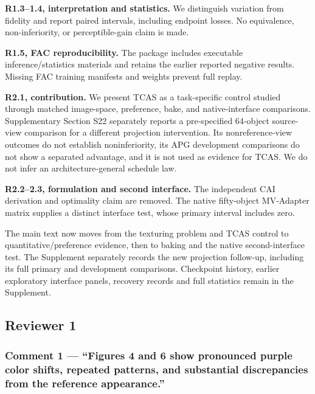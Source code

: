 \documentclass[
]{article}
\begin{document}
\textbf{R1.3--1.4, interpretation and statistics.} We distinguish
variation from fidelity and report paired intervals, including endpoint
losses. No equivalence, non-inferiority, or perceptible-gain claim is
made.

\textbf{R1.5, FAC reproducibility.} The package includes executable
inference/statistics materials and retains the earlier reported negative
results. Missing FAC training manifests and weights prevent full replay.

\textbf{R2.1, contribution.} We present TCAS as a task-specific control
studied through matched image-space, preference, bake, and
native-interface comparisons. Supplementary Section S22 separately
reports a pre-specified 64-object source-view comparison for a different
projection intervention. Its nonreference-view outcomes do not establish
noninferiority, its APG development comparisons do not show a separated
advantage, and it is not used as evidence for TCAS. We do not infer an
architecture-general schedule law.

\textbf{R2.2--2.3, formulation and second interface.} The independent
CAI derivation and optimality claim are removed. The native fifty-object
MV-Adapter matrix supplies a distinct interface test, whose primary
interval includes zero.

The main text now moves from the texturing problem and TCAS control to
quantitative/preference evidence, then to baking and the native
second-interface test. The Supplement separately records the new
projection follow-up, including its full primary and development
comparisons. Checkpoint history, earlier exploratory interface panels,
recovery records and full statistics remain in the Supplement.

\hypertarget{reviewer-1}{%
\subsection{Reviewer 1}\label{reviewer-1}}

\hypertarget{comment-1-figures-4-and-6-show-pronounced-purple-color-shifts-repeated-patterns-and-substantial-discrepancies-from-the-reference-appearance.}{%
\subsubsection{Comment 1 --- ``Figures 4 and 6 show pronounced purple
color shifts, repeated patterns, and substantial discrepancies from the
reference
appearance.''}\label{comment-1-figures-4-and-6-show-pronounced-purple-color-shifts-repeated-patterns-and-substantial-discrepancies-from-the-reference-appearance.}}
\end{document}
